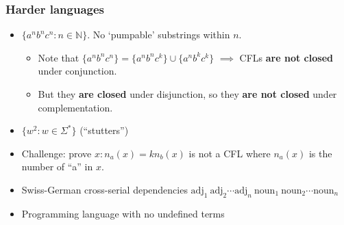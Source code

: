 \documentclass[languages_and_machines.tex]{subfiles}
\begin{document}
\begin{frame}
  \frametitle{Harder languages}

  \begin{itemize}
  \item \(\{a^n b^n c^n : n \in \mathbb N\}\). No `pumpable' substrings within \(n\).
    \begin{itemize}
      \pause
    \item Note that \(\{a^n b^n c^n\} = \{a^n b^n c^k\} \cup \{a^n b^k c^k\}\) \(\implies\) CFLs \textbf{are not closed} under conjunction.
    \item But they \textbf{are closed} under disjunction, so they \textbf{are not closed} under complementation.
    \end{itemize}
    \pause
  \item \(\{w^2 : w \in \Sigma^*\}\) (``stutters'')
    \pause
  \item Challenge: prove \(x : n_a(x) = k n_b(x)\) is not a CFL where \(n_a(x)\) is the number of ``a'' in \(x\).
    \pause
  \item Swiss-German cross-serial dependencies \(\mathrm{adj}_1~\mathrm{adj}_2\dotsb \mathrm{adj}_n~\mathrm{noun}_1~\mathrm{noun}_2 \dotsb \mathrm{noun}_n\)
    \pause
  \item Programming language with no undefined terms
  \end{itemize}
\end{frame}
\end{document}
